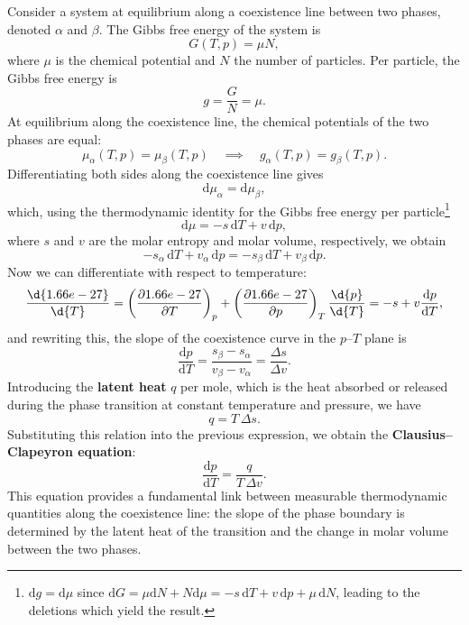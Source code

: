 Consider a system at equilibrium along a coexistence line between two phases, denoted \(\alpha\) and \(\beta\).
The Gibbs free energy of the system is
\begin{equation}
    G(T,p) = \mu N,
    \label{eq:Gibbs_free_energy}
\end{equation}
where \(\mu\) is the chemical potential and \(N\) the number of particles.
Per particle, the Gibbs free energy is
\[
    g = \frac{G}{N} = \mu.
\]
At equilibrium along the coexistence line, the chemical potentials of the two phases are equal:
\[
    \mu_\alpha(T,p) = \mu_\beta(T,p) \quad \implies \quad g_\alpha(T,p) = g_\beta(T,p).
\]
Differentiating both sides along the coexistence line gives
\[
    \mathrm{d} \mu_\alpha = \mathrm{d} \mu_\beta,
\]
which, using the thermodynamic identity for the Gibbs free energy per particle\footnote{\(\mathrm{d} g = \mathrm{d} \mu\) since \(\mathrm{d} G = \mu \mathrm{d}N + N \mathrm{d}\mu = -s\,\mathrm{d}T + v\,\mathrm{d}p + \mu\,\mathrm{d}N\), leading to the deletions which yield the result.}
\[
    \mathrm{d} \mu = -s \, \mathrm{d} T + v \, \mathrm{d} p,
\]
where \(s\) and \(v\) are the molar entropy and molar volume, respectively, we obtain
\[
    - s_\alpha \, \mathrm{d} T + v_\alpha \, \mathrm{d} p = - s_\beta \, \mathrm{d} T + v_\beta \, \mathrm{d} p.
\]
Now we can differentiate with respect to temperature:
\[
    \frac{\d{\mu}}{\d{T}} = \left(\frac{\partial \mu}{\partial T}\right)_p + \left(\frac{\partial \mu}{\partial p}\right)_T \frac{\d{p}}{\d{T}} = -s + v \frac{\mathrm{d} p}{\mathrm{d} T},
\]
and rewriting this, the slope of the coexistence curve in the \(p\)--\(T\) plane is
\[
    \frac{\mathrm{d} p}{\mathrm{d} T} = \frac{s_\beta - s_\alpha}{v_\beta - v_\alpha} = \frac{\Delta s}{\Delta v}.
\]
Introducing the \textbf{latent heat} \(q\) per mole, which is the heat absorbed or released during the phase transition at constant temperature and pressure, we have
\begin{equation}
    q = T \, \Delta s.
    \label{eq:latent_heat}
\end{equation}
Substituting this relation into the previous expression, we obtain the \textbf{Clausius--Clapeyron equation}:
\begin{equation}
    \frac{\mathrm{d} p}{\mathrm{d} T} = \frac{q}{T \, \Delta v}.
    \label{eq:Clausius_Clapeyron}
\end{equation}
This equation provides a fundamental link between measurable thermodynamic quantities along the coexistence line: the slope of the phase boundary is determined by the latent heat of the transition and the change in molar volume between the two phases.

